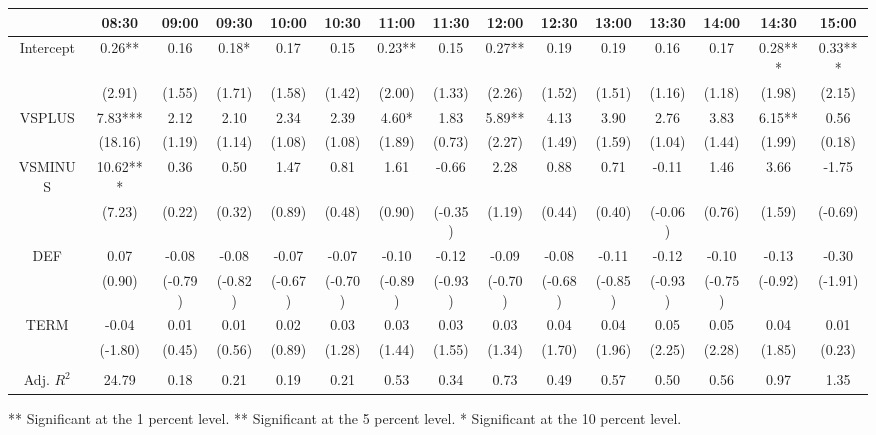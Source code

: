 \begin{table}[h]
\begin{threeparttable}
\begin{tabular}{ccccccccccccccc}
\toprule
                 & 08:30    & 09:00   & 09:30   & 10:00   & 10:30   & 11:00   & 11:30   & 12:00   & 12:30   & 13:00   & 13:30   & 14:00   & 14:30   & 15:00   \\ \midrule
 Intercept       & 0.26**   & 0.16    & 0.18*    & 0.17    & 0.15    & 0.23** & 0.15    & 0.27** & 0.19    & 0.19    & 0.16    & 0.17    & 0.28*** & 0.33*** \\
                 & (2.91)   & (1.55)  & (1.71)  & (1.58)  & (1.42)  & (2.00)  & (1.33)  & (2.26)  & (1.52)  & (1.51)  & (1.16)  & (1.18)  & (1.98)  & (2.15)  \\
 VSPLUS          & 7.83***  & 2.12    & 2.10    & 2.34    & 2.39    & 4.60*  & 1.83    & 5.89** & 4.13    & 3.90    & 2.76    & 3.83    & 6.15** & 0.56    \\
                 & (18.16)  & (1.19)  & (1.14)  & (1.08)  & (1.08)  & (1.89)  & (0.73)  & (2.27)  & (1.49)  & (1.59)  & (1.04)  & (1.44)  & (1.99)  & (0.18)  \\
 VSMINUS         & 10.62*** & 0.36    & 0.50    & 1.47    & 0.81    & 1.61    & -0.66   & 2.28    & 0.88    & 0.71    & -0.11   & 1.46    & 3.66    & -1.75   \\
                 & (7.23)   & (0.22)  & (0.32)  & (0.89)  & (0.48)  & (0.90)  & (-0.35) & (1.19)  & (0.44)  & (0.40)  & (-0.06) & (0.76)  & (1.59)  & (-0.69) \\
 DEF             & 0.07     & -0.08   & -0.08   & -0.07   & -0.07   & -0.10   & -0.12   & -0.09   & -0.08   & -0.11   & -0.12   & -0.10   & -0.13   & -0.30   \\
                 & (0.90)   & (-0.79) & (-0.82) & (-0.67) & (-0.70) & (-0.89) & (-0.93) & (-0.70) & (-0.68) & (-0.85) & (-0.93) & (-0.75) & (-0.92) & (-1.91) \\
 TERM            & -0.04    & 0.01    & 0.01    & 0.02    & 0.03    & 0.03    & 0.03    & 0.03    & 0.04    & 0.04    & 0.05    & 0.05    & 0.04    & 0.01    \\
                 & (-1.80)  & (0.45)  & (0.56)  & (0.89)  & (1.28)  & (1.44)  & (1.55)  & (1.34)  & (1.70)  & (1.96)  & (2.25)  & (2.28)  & (1.85)  & (0.23)  \\
                 &          &         &         &         &         &         &         &         &         &         &         &         &         &         \\
 Adj. $R^{2}$ & 24.79    & 0.18    & 0.21    & 0.19    & 0.21    & 0.53    & 0.34    & 0.73    & 0.49    & 0.57    & 0.50    & 0.56    & 0.97    & 1.35   \\
\bottomrule
\end{tabular}

\begin{tablenotes}
\item *** Significant at the 1 percent level.    
** Significant at the 5 percent level.   
* Significant at the 10 percent level.
\end{tablenotes}


\end{threeparttable}

\end{table}


